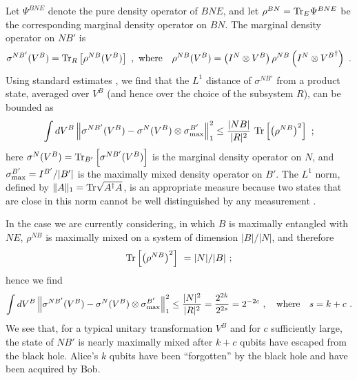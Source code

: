 \documentclass[12pt]{article}
\begin{document}
Let $\Psi^{BNE}$ denote the pure density operator of $BNE$,  and let $\rho^{BN}={\rm Tr}_E\Psi^{BNE}$ be the corresponding marginal density operator on $BN$. The marginal density operator on $NB'$ is
\begin{eqnarray}
\sigma^{NB'}(V^B)= {\rm Tr}_R \left[\rho^{NB}(V^B)\right]~, \,\, {\rm where}\quad 
\rho^{NB}(V^B)=\left(I^N\otimes V^B\right)\rho^{NB}\left(I^N\otimes {V^B}^\dagger \right)~.
\end{eqnarray}
Using standard estimates \cite{abeyesinghe,yard}, we find that the $L^1$ distance of $\sigma^{NB'}$ from a product state, averaged over $V^B$ (and hence over the choice of the subsystem $R$), can be bounded as
\begin{eqnarray}
\int dV^B\left\| \sigma^{NB'}(V^B)-\sigma^{N}(V^B)\otimes \sigma^{B'}_{\rm max}\right\|_1^2 \le \frac{|NB|}{|R|^2}~{\rm Tr}\left[\left(\rho^{NB}\right)^2\right]~;
\end{eqnarray}
here $\sigma^{N}(V^B)={\rm Tr}_{B'}\left[\sigma^{NB'}(V^B)\right]$
is the marginal density operator on $N$, and $\sigma^{B'}_{\rm max}= I^{B'}/|B'|$ is the maximally mixed density operator on $B'$. The $L^1$ norm, defined by $\|A\|_1= {\rm Tr} \sqrt{A^\dagger A}$, is an appropriate measure because two states that are close in this norm cannot be well distinguished by any measurement \cite{fuchs}. 

In the case we are currently considering, in which $B$ is maximally entangled with $NE$, $\rho^{NB}$ is maximally mixed on a system of dimension $|B|/|N|$, and therefore 
\begin{equation}
{\rm Tr}\left[\left(\rho^{NB}\right)^2\right]~= |N|/|B|~;
\end{equation}
hence we find
\begin{eqnarray}
\label{quantum-out}
\int dV^B\left\| \sigma^{NB'}(V^B)-\sigma^{N}(V^B)\otimes \sigma^{B'}_{\rm max}\right\|_1^2 \le \frac{|N|^2}{|R|^2}= \frac{2^{2k}}{2^{2s}}= 2^{-2c}~,\quad {\rm where}\quad s=k+c~.
\end{eqnarray}
We see that, for a typical unitary transformation $V^B$ and for $c$ sufficiently large, the state of $NB'$ is nearly maximally mixed after $k+c$ qubits have escaped from the black hole. Alice's $k$ qubits have been ``forgotten'' by the black hole and have been acquired by Bob.  
\end{document}
